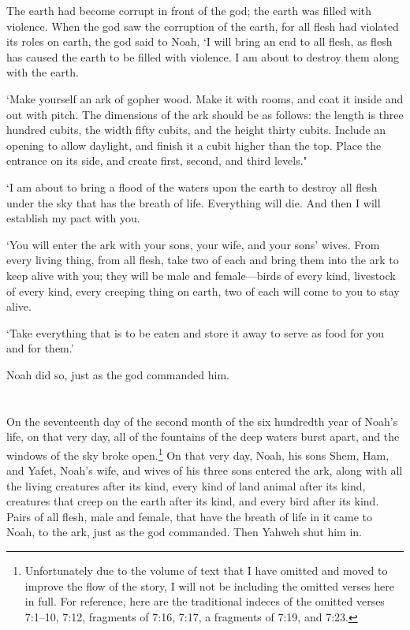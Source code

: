 The earth had become corrupt in front of the god;
the earth was filled with violence.
When the god saw the corruption of the earth,
for all flesh had violated its roles on earth,
the god said to Noah, `I will bring an end to all flesh,
as flesh has caused the earth to be filled with violence.
I am about to destroy them along with the earth.

`Make yourself an ark of gopher wood.
Make it with rooms, 
and coat it inside and out with pitch.
The dimensions of the ark should be as follows: 
the length is three hundred cubits, 
the width fifty cubits,
and the height thirty cubits.
Include an opening to allow daylight,
and finish it a cubit higher than the top.
Place the entrance on its side, 
and create first, second, and third levels."

`I am about to bring a flood of the waters upon the earth 
to destroy all flesh under the sky that has the breath of life.
Everything will die.
And then I will establish my pact with you.

`You will enter the ark
with your sons,
your wife,
and your sons' wives. 
From every living thing,
from all flesh,
take two of each and bring them into the ark 
to keep alive with you;
they will be male and female---birds of every kind,
livestock of every kind,
every creeping thing on earth,
two of each will come to you to stay alive.

`Take everything that is to be eaten and store it away
to serve as food for you 
and for them.'

Noah did so, just as the god commanded him.

\section*{\secsep}
On the seventeenth day of the second month
of the six hundredth year of Noah's life,
on that very day, all of the fountains of 
the deep waters
burst apart,
and the windows of the sky broke open.\footnote{
Unfortunately due to the volume of text that I have
omitted and moved to improve the flow of the story, 
I will not be including the omitted verses here in full.
For reference, here are the traditional indeces 
of the omitted verses 7:1--10, 7:12, fragments of 7:16, 7:17, a fragments of 7:19, and 7:23.}
On that very day, Noah, his sons Shem, Ham, and Yafet,
Noah's wife, and wives of his three sons entered the ark,
along with
all the living creatures after its kind,
every kind of land animal after its kind, 
creatures that creep on the earth after its kind,
and every bird after its kind.
Pairs of all flesh, male and female,
that have the breath of life in it came to Noah, to the ark,
just as the god commanded.
Then Yahweh shut him in.

